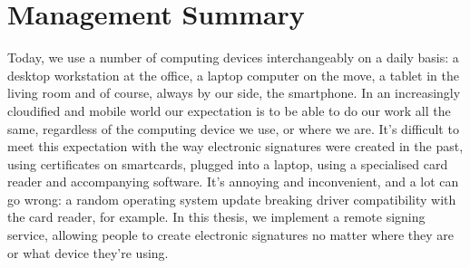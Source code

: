 \chapter*{Management Summary}
\label{chap:managementSummary}


Today, we use a number of computing devices interchangeably on a daily basis: a desktop workstation at the office, a laptop computer
on the move, a tablet in the living room and of course, always by our side, the smartphone.
In an increasingly cloudified and mobile world our expectation is to be able to do our work all the same,
regardless of the computing device we use, or where we are.
It's difficult to meet this expectation with the way electronic signatures were created in the past,
using certificates on smartcards, plugged into a laptop, using a specialised card reader and accompanying software.
It's annoying and inconvenient, and a lot can go wrong: a random operating system update breaking driver compatibility with the card reader, for example.
In this thesis, we implement a remote signing service, allowing people to create electronic signatures no matter
where they are or what device they're using.

